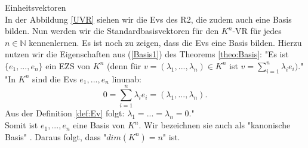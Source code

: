 \theoremstyle{example}
\begin{example}{Einheitsvektoren}
\\ In der Abbildung \ref{UVR} siehen wir die \aclp{Ev} des \acl{R2}, die zudem auch eine Basis bilden. Nun werden wir die Standardbasisvektoren für den $K^n$-\acl{VR} für jedes $n \in \mathbb{N}$ kennenlernen.
Es ist noch zu zeigen, dass die \aclp{Ev} eine Basis bilden. Hierzu nutzen wir die Eigenschaften aus (\ref{Basis1}) des Theorems \ref{theo:Basis}:
"Es ist $\{e_1,...,e_n\}$ ein \acl{EZS} von $K^n$ (denn für $v =(\lambda_1,...,\lambda_n) \in K^n$ ist $v = \sum \limits_{i=1}^{n} \lambda_i e_i)$.\grqq" \cite[S. 40, 9.9]{Skript}
\\"In $K^n$ sind die \aclp{Ev} $e_1,...,e_n$ \acl{linunab}: \[0=\sum \limits_{i=1}^{n} \lambda_i e_i = (\lambda_1,...,\lambda_n)\text{.}\]
Aus der Definition \ref{def:Ev} folgt: $\lambda_1=...=\lambda_n=0$." \cite[S. 41, 9.14]{S. 41}
\\ Somit ist ${e_1,...,e_n}$ eine Basis von $K^n$. Wir bezeichnen sie auch als "kanonische Basis" \cite[S. 42, 9.17]{Skript} . Daraus folgt, dass "$dim(K^n) = n$" \cite[S. 44, 9.24 (a)]{Skript} ist.
\end{example}

